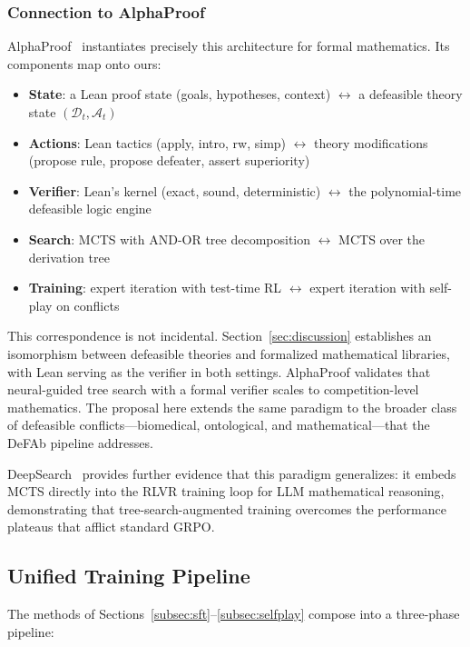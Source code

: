 \documentclass{article}
\theoremstyle{definition}
\newcommand{\D}{\mathcal{D}}
\begin{document}
\subsubsection{Connection to AlphaProof}

AlphaProof~\cite{alphaproof2025} instantiates precisely this architecture for formal mathematics. Its components map onto ours:

\begin{itemize}[nosep]
    \item \textbf{State}: a Lean proof state (goals, hypotheses, context) $\leftrightarrow$ a defeasible theory state $(\D_t, \mathcal{A}_t)$
    \item \textbf{Actions}: Lean tactics (apply, intro, rw, simp) $\leftrightarrow$ theory modifications (propose rule, propose defeater, assert superiority)
    \item \textbf{Verifier}: Lean's kernel (exact, sound, deterministic) $\leftrightarrow$ the polynomial-time defeasible logic engine
    \item \textbf{Search}: MCTS with AND-OR tree decomposition $\leftrightarrow$ MCTS over the derivation tree
    \item \textbf{Training}: expert iteration with test-time RL $\leftrightarrow$ expert iteration with self-play on conflicts
\end{itemize}

This correspondence is not incidental. Section~\ref{sec:discussion} establishes an isomorphism between defeasible theories and formalized mathematical libraries, with Lean serving as the verifier in both settings. AlphaProof validates that neural-guided tree search with a formal verifier scales to competition-level mathematics. The proposal here extends the same paradigm to the broader class of defeasible conflicts---biomedical, ontological, and mathematical---that the DeFAb pipeline addresses.

DeepSearch~\cite{deepsearch2026} provides further evidence that this paradigm generalizes: it embeds MCTS directly into the RLVR training loop for LLM mathematical reasoning, demonstrating that tree-search-augmented training overcomes the performance plateaus that afflict standard GRPO.


\subsection{Unified Training Pipeline}\label{subsec:unified_pipeline}

The methods of Sections~\ref{subsec:sft}--\ref{subsec:selfplay} compose into a three-phase pipeline:
\end{document}
